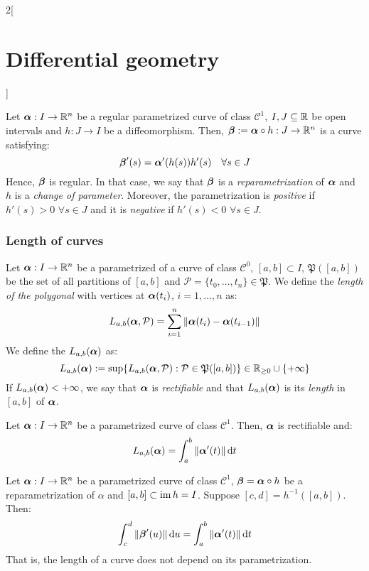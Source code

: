 \documentclass[../../../main.tex]{subfiles}
\begin{document}
\begin{multicols}{2}[\section{Differential geometry}]
\begin{definition}
  \end{definition}
  \begin{definition}
    Let $\boldsymbol{\mathrm{\alpha}}:I\rightarrow\mathbb{R}^n$ be a regular parametrized curve of class $\mathcal{C}^1$, $I,J\subseteq\mathbb{R}$ be open intervals and $h:J\rightarrow I$ be a diffeomorphism. Then, $\boldsymbol{\mathrm{\beta}}:=\boldsymbol{\mathrm{\alpha}}\circ h:J\rightarrow\mathbb{R}^n$ is a curve satisfying: $$\boldsymbol{\mathrm{\beta}}'(s)=\boldsymbol{\mathrm{\alpha}}'(h(s))h'(s)\quad\forall s\in J$$ Hence, $\boldsymbol{\mathrm{\beta}}$ is regular. In that case, we say that $\boldsymbol{\mathrm{\beta}}$ is a \emph{reparametrization} of $\boldsymbol{\mathrm{\alpha}}$ and $h$ is a \emph{change of parameter}. Moreover, the parametrization is \emph{positive} if $h'(s)>0$ $\forall s\in J$ and it is \emph{negative} if $h'(s)<0$ $\forall s\in J$.
  \end{definition}
  \subsubsection{Length of curves}
  \begin{definition}
    Let $\boldsymbol{\mathrm{\alpha}}:I\rightarrow\mathbb{R}^n$ be a parametrized of a curve of class $\mathcal{C}^0$, $[a,b]\subset I$, $\mathfrak{P}([a,b])$ be the set of all partitions of $[a,b]$ and $\mathcal{P}=\{t_0,\ldots,t_n\}\in\mathfrak{P}$. We define the \emph{length of the polygonal} with vertices at $\boldsymbol{\mathrm{\alpha}}(t_i)$, $i=1,\ldots,n$ as: $$L_{a,b}(\boldsymbol{\mathrm{\alpha}},\mathcal{P})=\sum_{i=1}^n\|\boldsymbol{\mathrm{\alpha}}(t_i)-\boldsymbol{\mathrm{\alpha}}(t_{i-1})\|$$ We define the $L_{a,b}(\boldsymbol{\mathrm{\alpha}})$ as:
    $$L_{a,b}(\boldsymbol{\mathrm{\alpha}}):=\sup\{L_{a,b}(\boldsymbol{\mathrm{\alpha}},\mathcal{P}):\mathcal{P}\in\mathfrak{P}([a,b])\}\in\mathbb{R}_{\geq 0}\cup\{+\infty\}$$ If $L_{a,b}(\boldsymbol{\mathrm{\alpha}})<+\infty$, we say that $\boldsymbol{\mathrm{\alpha}}$ is \emph{rectifiable} and that $L_{a,b}(\boldsymbol{\mathrm{\alpha}})$ is its \emph{length} in $[a,b]$ of $\boldsymbol{\mathrm{\alpha}}$.
  \end{definition}
  \begin{proposition}
    Let $\boldsymbol{\mathrm{\alpha}}:I\rightarrow\mathbb{R}^n$ be a parametrized curve of class $\mathcal{C}^1$. Then, $\boldsymbol{\mathrm{\alpha}}$ is rectifiable and: $$L_{a,b}(\boldsymbol{\mathrm{\alpha}})=\int_a^b\|\boldsymbol{\mathrm{\alpha}}'(t)\|\dd{t}$$
  \end{proposition}
  \begin{proposition}
    Let $\boldsymbol{\mathrm{\alpha}}:I\rightarrow\mathbb{R}^n$ be a parametrized curve of class $\mathcal{C}^1$, $\boldsymbol{\mathrm{\beta}}=\boldsymbol{\mathrm{\alpha}}\circ h$ be a reparametrization of $\alpha$ and $[a,b]\subset \operatorname{im} h=I$. Suppose $[c,d]=h^{-1}([a,b])$. Then: $$\int_c^d\|\boldsymbol{\mathrm{\beta}}'(u)\|\dd{u}=\int_a^b\|\boldsymbol{\mathrm{\alpha}}'(t)\|\dd{t}$$ That is, the length of a curve does not depend on its parametrization.

\end{proposition}
\end{multicols}
\end{document}

